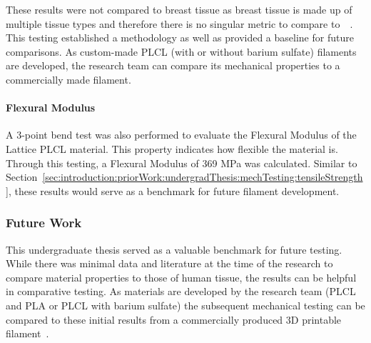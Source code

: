 These results were not compared to breast tissue as breast tissue is made up of multiple tissue types and therefore there is no singular metric to compare to~\cite{RefWorks:RefID:36-american2021breast}~\cite{RefWorks:RefID:370-einsteinisaac}. This testing established a methodology as well as provided a baseline for future comparisons. As custom-made PLCL (with or without barium sulfate) filaments are developed, the research team can compare its mechanical properties to a commercially made filament.

\paragraph*{Flexural Modulus\label{sec:introduction:priorWork:undergradThesis:mechTesting:flexuralModulus}}

A 3-point bend test was also performed to evaluate the Flexural Modulus of the Lattice PLCL material. This property indicates how flexible the material is. Through this testing, a Flexural Modulus of 369 MPa was calculated. Similar to Section~\ref{sec:introduction:priorWork:undergradThesis:mechTesting:tensileStrength}, these results would serve as a benchmark for future filament development.

\subsubsection{Future Work\label{sec:introduction:priorWork:undergradThesis:futureWork}}

This undergraduate thesis served as a valuable benchmark for future testing. While there was minimal data and literature at the time of the research to compare material properties to those of human tissue, the results can be helpful in comparative testing. As materials are developed by the research team (PLCL and PLA or PLCL with barium sulfate) the subsequent mechanical testing can be compared to these initial results from a commercially produced 3D printable filament~\cite{RefWorks:RefID:371-bakhtardesign}.
